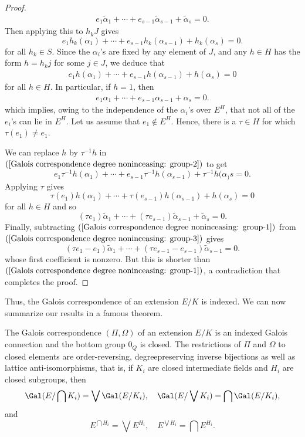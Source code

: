\begin{proof}
\begin{align}\label{Galois correspondence degree noninceasing: group-1}
e_1\widetilde{\alpha}_1+\cdots+e_{s-1}\widetilde{\alpha}_{s-1}+\widetilde{\alpha}_s=0.
\end{align}
Then applying this to $h_kJ$ gives
\[e_1 h_k(\alpha_1)+\cdots+e_{s-1} h_k(\alpha_{s-1})+h_k(\alpha_s)=0.\]
for all $h_k\in S$. Since the $\alpha_i$'s are fixed by any element of $J$, and any $h\in H$ has the form $h=h_kj$ for some $j\in J$, we deduce that
\begin{align}\label{Galois correspondence degree noninceasing: group-2}
e_1 h(\alpha_1)+\cdots+e_{s-1} h(\alpha_{s-1})+h(\alpha_s)=0
\end{align}
for all $h\in H$. In particular, if $h=1$, then
\begin{align}\label{Galois correspondence degree noninceasing: group-3}
e_1\alpha_1+\cdots+e_{s-1}\alpha_{s-1}+\alpha_s=0.
\end{align}
which implies, owing to the independence of the $\alpha_i$'s over $E^H$, that not all of the $e_i$'s can lie in $E^H$. Let us assume that $e_1\notin E^H$. Hence, there is a $\tau\in H$ for which $\tau(e_1)\neq e_1$.\par
We can replace $h$ by $\tau^{-1}h$ in $(\ref{Galois correspondence degree noninceasing: group-2})$ to get
\[e_1 \tau^{-1}h(\alpha_1)+\cdots+e_{s-1}\tau^{-1}h(\alpha_{s-1})+\tau^{-1}h(\alpha_)s=0.\]
Applying $\tau$ gives
\[\tau(e_1)h(\alpha_1)+\cdots+\tau(e_{s-1})h(\alpha_{s-1})+h(\alpha_s)=0\]
for all $h\in H$ and so
\[(\tau e_1)\widetilde{\alpha}_1+\cdots+(\tau e_{s-1})\widetilde{\alpha}_{s-1}+\widetilde{\alpha}_{s}=0.\]
Finally, subtracting $(\ref{Galois correspondence degree noninceasing: group-1})$ from $(\ref{Galois correspondence degree noninceasing: group-3})$ gives
\[(\tau e_1-e_1)\widetilde{\alpha}_1+\cdots+(\tau e_{s-1}-e_{s-1})\widetilde{\alpha}_{s-1}=0.\]
whose first coefficient is nonzero. But this is shorter than $(\ref{Galois correspondence degree noninceasing: group-1})$, a contradiction that completes the proof.
\end{proof}
Thus, the Galois correspondence of an extension $E/K$ is indexed. We can now summarize our results in a famous theorem.
\begin{theorem}
The Galois correspondence $(\Pi,\Omega)$ of an extension $E/K$ is an indexed Galois connection and the bottom group $0_Q$ is closed. The restrictions of $\Pi$ and $\Omega$ to closed elements are order-reversing, degreepreserving inverse bijections as well as lattice anti-isomorphisms, that is, if $K_i$ are closed intermediate fields and $H_i$ are closed subgroups, then
\[\Gal(E/\bigcap K_i)=\bigvee\Gal(E/K_i),\quad \Gal(E/\bigvee K_i)=\bigcap\Gal(E/K_i),\]
and
\[E^{\bigcap H_i}=\bigvee E^{H_i},\quad E^{\bigvee H_i}=\bigcap E^{H_i}.\]
\end{theorem}
